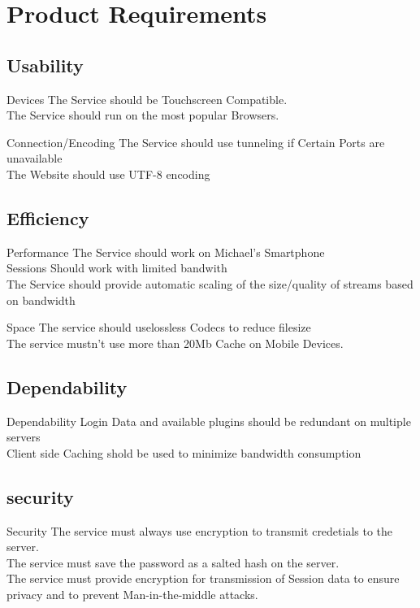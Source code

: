 \documentclass[8pt]{beamer}
\begin{document}
\section{Product Requirements}
\subsection{Usability}
\begin{frame}{Devices}
The Service should be Touchscreen Compatible.\\\pause
The Service should run on the most popular Browsers.
\end{frame}

\begin{frame}{Connection/Encoding}
The Service should use tunneling if Certain Ports are unavailable\\\pause
The Website should use UTF-8 encoding
\end{frame}
\subsection{Efficiency}
\begin{frame}{Performance}
The Service should work on Michael's Smartphone\\\pause
Sessions Should work with limited bandwith\\\pause
The Service should provide automatic scaling of the size/quality of streams based on bandwidth
\end{frame}
\begin{frame}{Space}
The service should uselossless Codecs to reduce filesize\\\pause
The service mustn't use more than 20Mb Cache on Mobile Devices.
\end{frame}
\subsection{Dependability}
\begin{frame}{Dependability}
Login Data and available plugins should be redundant on multiple servers\\\pause
Client side Caching shold be used to minimize bandwidth consumption
\end{frame}
\subsection{security}
\begin{frame}{Security}
The service must always use encryption to transmit credetials to
the server.\\\pause
The service must save the password as a salted hash on the server.\\\pause
The service must provide encryption for transmission of Session
data to ensure privacy and to prevent Man-in-the-middle attacks.
\end{frame}
\end{document}

